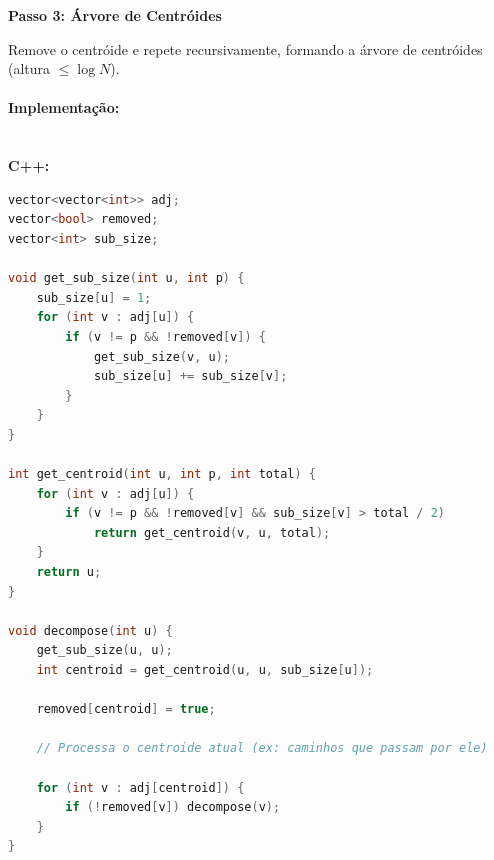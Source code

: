\hfill
%
\begin{minipage}[t]{0.31\textwidth}
    \centering
    \textbf{Passo 3: Árvore de Centróides}\\
    \vspace{0.2cm}

    \vspace{0.2cm}
    \footnotesize
    \raggedright
    Remove o centróide e repete recursivamente, formando a árvore de centróides (altura $\le \log N$).
\end{minipage}

\vspace{0.3cm}

\paragraph{Implementação: }\mbox{}\\
\textbf{C++:}
\begin{lstlisting}[language=C++]
vector<vector<int>> adj;
vector<bool> removed;
vector<int> sub_size;

void get_sub_size(int u, int p) {
    sub_size[u] = 1;
    for (int v : adj[u]) {
        if (v != p && !removed[v]) {
            get_sub_size(v, u);
            sub_size[u] += sub_size[v];
        }
    }
}

int get_centroid(int u, int p, int total) {
    for (int v : adj[u]) {
        if (v != p && !removed[v] && sub_size[v] > total / 2)
            return get_centroid(v, u, total);
    }
    return u;
}

void decompose(int u) {
    get_sub_size(u, u);
    int centroid = get_centroid(u, u, sub_size[u]);
    
    removed[centroid] = true;
    
    // Processa o centroide atual (ex: caminhos que passam por ele)
    
    for (int v : adj[centroid]) {
        if (!removed[v]) decompose(v);
    }
}
\end{lstlisting}